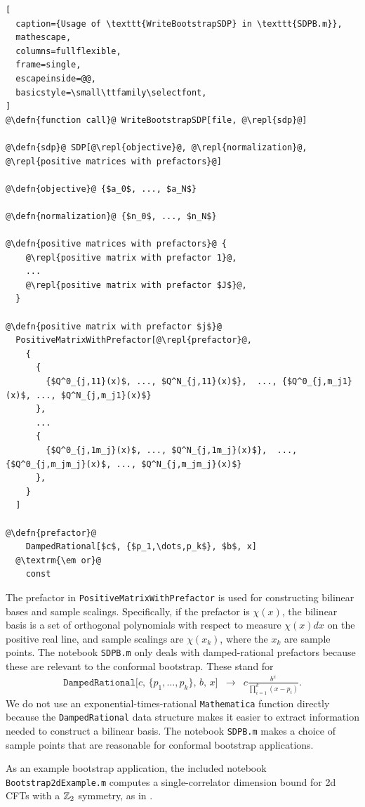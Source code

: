 \documentclass[12pt]{article}
\numberwithin{equation}{section}
\renewcommand{\be}{\begin{eqnarray}}
\renewcommand{\ee}{\end{eqnarray}}
\newcommand\repl[1]{$\langle$\textrm{\em #1}$\rangle$}
\newcommand\defn[1]{\textrm{\em #1}\ $\equiv$}
\begin{document}
\begin{lstlisting}[
  caption={Usage of \texttt{WriteBootstrapSDP} in \texttt{SDPB.m}},
  mathescape,
  columns=fullflexible,
  frame=single,
  escapeinside=@@,
  basicstyle=\small\ttfamily\selectfont,
]
@\defn{function call}@ WriteBootstrapSDP[file, @\repl{sdp}@]

@\defn{sdp}@ SDP[@\repl{objective}@, @\repl{normalization}@, @\repl{positive matrices with prefactors}@]

@\defn{objective}@ {$a_0$, ..., $a_N$}

@\defn{normalization}@ {$n_0$, ..., $n_N$}

@\defn{positive matrices with prefactors}@ {
    @\repl{positive matrix with prefactor 1}@,
    ...
    @\repl{positive matrix with prefactor $J$}@,
  }

@\defn{positive matrix with prefactor $j$}@
  PositiveMatrixWithPrefactor[@\repl{prefactor}@,
    {
      {
        {$Q^0_{j,11}(x)$, ..., $Q^N_{j,11}(x)$},  ..., {$Q^0_{j,m_j1}(x)$, ..., $Q^N_{j,m_j1}(x)$}
      },
      ...
      {
        {$Q^0_{j,1m_j}(x)$, ..., $Q^N_{j,1m_j}(x)$},  ..., {$Q^0_{j,m_jm_j}(x)$, ..., $Q^N_{j,m_jm_j}(x)$}
      },
    }
  ]
  
@\defn{prefactor}@
    DampedRational[$c$, {$p_1,\dots,p_k$}, $b$, x]
  @\textrm{\em or}@
    const  
\end{lstlisting}

The prefactor in \texttt{PositiveMatrixWithPrefactor} is used for constructing bilinear bases and sample scalings.  Specifically, if the prefactor is $\chi(x)$, the bilinear basis is a set of orthogonal polynomials with respect to measure $\chi(x)dx$ on the positive real line, and sample scalings are $\chi(x_k)$, where the $x_k$ are sample points.
 The notebook \texttt{SDPB.m} only deals with damped-rational prefactors because these are relevant to the conformal bootstrap.  These stand for
\be
\texttt{DampedRational[$c$, \{$p_1,\dots,p_k$\}, $b$, $x$]} &\to& c\frac{b^x}{\prod_{i=1}^k (x-p_i)}.
\ee
We do not use an exponential-times-rational \texttt{Mathematica} function directly because the  \texttt{DampedRational} data structure makes it easier to extract information needed to construct a bilinear basis.  The notebook \texttt{SDPB.m} makes a choice of sample points that are reasonable for conformal bootstrap applications.

As an example bootstrap application, the included notebook \texttt{Bootstrap2dExample.m} computes a single-correlator dimension bound for 2d CFTs with a $\mathbb{Z}_2$ symmetry, as in \cite{Rychkov:2009ij}.
\end{document}
